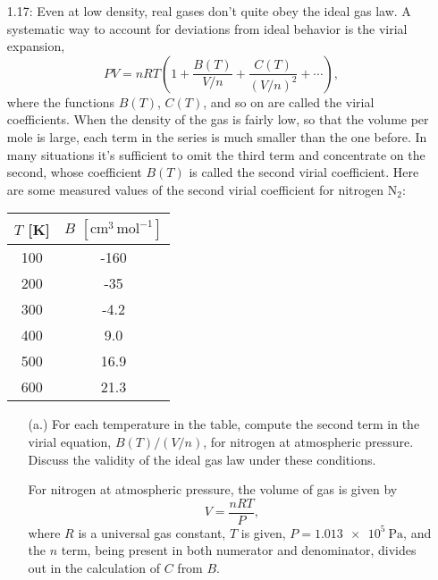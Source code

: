 \documentclass[a4paper, 12pt]{config/homework}
\begin{document}
\begin{enumerate}
\vspace{\baselineskip}
\item [1.17:] Even at low density, real gases don't quite obey the ideal gas law. A systematic way to account for deviations from ideal behavior is the virial expansion,
\[PV=nRT\left(1 + \frac{B(T)}{V/n} + \frac{C(T)}{(V/n)^2} + \cdots\right),\]
where the functions \(B(T)\), \(C(T)\), and so on are called the virial coefficients. When the density of the gas is fairly low, so that the volume per mole is large, each term in the series is much smaller than the one before. In many situations it's sufficient to omit the third term and concentrate on the second, whose coefficient \(B(T)\) is called the second virial coefficient. Here are some measured values of the second virial coefficient for nitrogen \(\text{N}_2\):
\begin{table}[H]
\begin{center}
\begin{tabular}{cc}
\(T\) {[}K{]} & \(B\) \(\left[\text{cm}^3\,\text{mol}^{-1}\right]\) \\ \hline
100           & -160                                   \\
200           & -35                                    \\
300           & -4.2                                   \\
400           & 9.0                                    \\
500           & 16.9                                   \\
600           & 21.3
\end{tabular}
\end{center}
\end{table}
\begin{enumerate}
\item[(a.)] For each temperature in the table, compute the second term in the virial equation, \(B(T)/(V/n)\), for nitrogen at atmospheric pressure. Discuss the validity of the ideal gas law under these conditions.

For nitrogen at atmospheric pressure, the volume of gas is given by
\[V = \frac{nRT}{P},\]
where \(R\) is a universal gas constant, \(T\) is given, \(P=\qty{1.013e5}{\pascal}\), and the \(n\) term, being present in both numerator and denominator, divides out in the calculation of \(C\) from \(B\).


\end{enumerate}
\end{enumerate}
\end{document}
